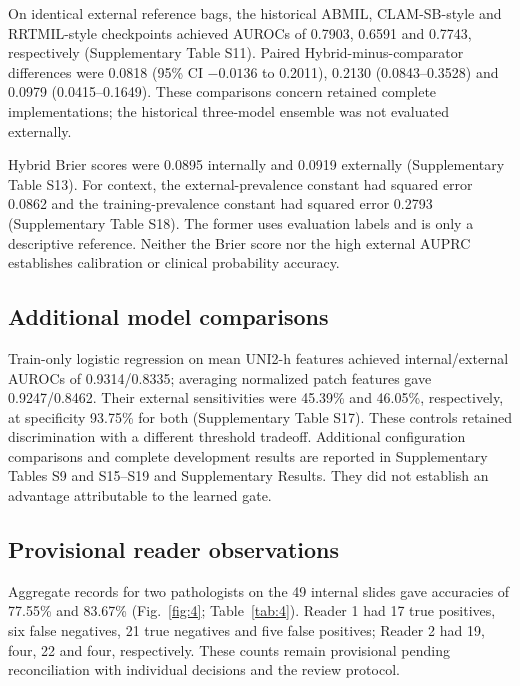 On identical external reference bags, the historical ABMIL, CLAM-SB-style and RRTMIL-style checkpoints achieved AUROCs of 0.7903, 0.6591 and 0.7743, respectively (Supplementary Table S11). Paired Hybrid-minus-comparator differences were 0.0818 (95\% CI $-0.0136$ to 0.2011), 0.2130 (0.0843--0.3528) and 0.0979 (0.0415--0.1649). These comparisons concern retained complete implementations; the historical three-model ensemble was not evaluated externally.

Hybrid Brier scores were 0.0895 internally and 0.0919 externally (Supplementary Table S13). For context, the external-prevalence constant had squared error 0.0862 and the training-prevalence constant had squared error 0.2793 (Supplementary Table S18). The former uses evaluation labels and is only a descriptive reference. Neither the Brier score nor the high external AUPRC establishes calibration or clinical probability accuracy.


\subsection{Additional model comparisons}

Train-only logistic regression on mean UNI2-h features achieved internal/external AUROCs of 0.9314/0.8335; averaging normalized patch features gave 0.9247/0.8462. Their external sensitivities were 45.39\% and 46.05\%, respectively, at specificity 93.75\% for both (Supplementary Table S17). These controls retained discrimination with a different threshold tradeoff. Additional configuration comparisons and complete development results are reported in Supplementary Tables S9 and S15--S19 and Supplementary Results. They did not establish an advantage attributable to the learned gate.

\subsection{Provisional reader observations}

Aggregate records for two pathologists on the 49 internal slides gave accuracies of 77.55\% and 83.67\% (Fig.~\ref{fig:4}; Table~\ref{tab:4}). Reader 1 had 17 true positives, six false negatives, 21 true negatives and five false positives; Reader 2 had 19, four, 22 and four, respectively. These counts remain provisional pending reconciliation with individual decisions and the review protocol. 

